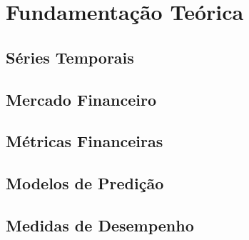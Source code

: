 \chapter{Fundamentação Teórica}
\label{FundamentacaoTeorica}


\section{Séries Temporais}
\section{Mercado Financeiro}
\section{Métricas Financeiras}
\section{Modelos de Predição}
\section{Medidas de Desempenho}
